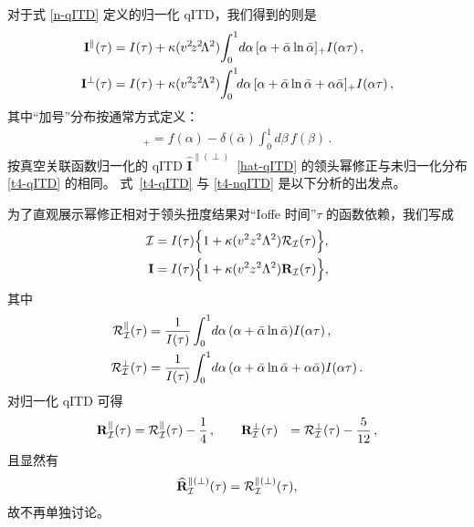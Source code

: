 对于式 \eqref{n-qITD} 定义的归一化 qITD，我们得到的则是
\begin{align}
\label{t4-nqITD}
  \mathbf{I}^\parallel(\tau)
&= I(\tau) +
  \kappa (v^2\! z^2\!\Lambda^2) \!\int_0^1\!d\alpha \, [\alpha + \bar\alpha \ln \bar\alpha]_+I(\alpha \tau )\,,
\notag\\
  \mathbf{I}^\perp(\tau)
&= I(\tau) +
  \kappa (v^2\! z^2\!\Lambda^2) \!\int_0^1\!\!d\alpha \, [\alpha + \bar\alpha \ln \bar\alpha + \alpha\bar\alpha]_+I(\alpha \tau )\,,
\end{align}
其中``加号''分布按通常方式定义：
\begin{align}
  [f(\alpha)]_+ = f(\alpha) - \delta(\bar\alpha)\int_0^1 d\beta\, f(\beta)\,.
\end{align}
按真空关联函数归一化的 qITD $\widehat{\mathbf{I}}^{\parallel(\perp)}$~\eqref{hat-qITD} 的领头幂修正与未归一化分布 \eqref{t4-qITD} 的相同。
式~\eqref{t4-qITD} 与 \eqref{t4-nqITD} 是以下分析的出发点。

为了直观展示幂修正相对于领头扭度结果对``Ioffe 时间''$\tau$ 的函数依赖，我们写成
\begin{align}
    \mathcal{I} &= I(\tau)\Big\{ 1 + \kappa (v^2 z^2\Lambda^2) \mathcal{R}_{\mathcal{I}}(\tau)\Big\},
\notag\\
    \mathbf{I} &= I(\tau)\Big\{ 1 + \kappa (v^2 z^2\Lambda^2) \mathbf{R}_{\mathcal{I}}(\tau)\Big\},
\end{align}
其中
\begin{align}
\mathcal{R}_{\mathcal{I}}^\parallel(\tau) & = \frac{1}{I(\tau)} \int_0^1\!d\alpha \, 
(\alpha + \bar\alpha \ln \bar\alpha)I(\alpha \tau)\,,
\notag\\  
\mathcal{R}_{\mathcal{I}}^\perp(\tau)
& = \frac{1}{I(\tau)} \int_0^1\!d\alpha \, 
(\alpha + \bar\alpha \ln \bar\alpha + \alpha\bar\alpha)I(\alpha \tau)\,.
\end{align}
对归一化 qITD 可得
\begin{align}
  \mathbf{R}_{\mathcal{I}}^\parallel(\tau) &= \mathcal{R}_{\mathcal{I}}^\parallel(\tau) - \frac14\,, 
\qquad
  \mathbf{R}_{\mathcal{I}}^\perp(\tau) &= \mathcal{R}_{\mathcal{I}}^\perp(\tau) - \frac5{12}\,, 
\end{align}
且显然有
\begin{eqnarray}
\widehat{\mathbf{R}}_{\mathcal{I}}^{\parallel(\perp)}(\tau) = \mathcal{R}_{\mathcal{I}}^{\parallel(\perp)}(\tau),
\end{eqnarray}
故不再单独讨论。

